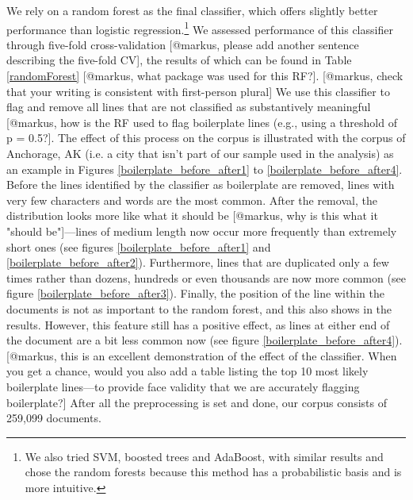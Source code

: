 \documentclass[11pt]{article}
\begin{document}

%

%

We rely on a random forest as the final classifier, which offers slightly better performance than logistic regression.\footnote{We also tried SVM, boosted trees and AdaBoost, with similar results and chose the random forests because this method has a probabilistic basis and is more intuitive.} We assessed performance of this classifier through five-fold cross-validation [@markus, please add another sentence describing the five-fold CV], the results of which can be found in Table \ref{randomForest} [@markus, what package was used for this RF?]. [@markus, check that your writing is consistent with first-person plural] We use this classifier to flag and remove all lines that are not classified as substantively meaningful [@markus, how is the RF used to flag boilerplate lines (e.g., using a threshold of p = 0.5?]. The effect of this process on the corpus is illustrated with the corpus of Anchorage, AK (i.e. a city that isn't part of our sample used in the analysis) as an example in Figures \ref{boilerplate_before_after1} to \ref{boilerplate_before_after4}. Before the lines identified by the classifier as boilerplate are removed, lines with very few characters and words are the most common. After the removal, the distribution looks more like what it should be [@markus, why is this what it "should be"]---lines of medium length now occur more frequently than extremely short ones (see figures \ref{boilerplate_before_after1} and \ref{boilerplate_before_after2}). Furthermore, lines that are duplicated only a few times rather than dozens, hundreds or even thousands are now more common (see figure \ref{boilerplate_before_after3}). Finally, the position of the line within the documents is not as important to the random forest, and this also shows in the results. However, this feature still has a positive effect, as lines at either end of the document are a bit less common now (see figure \ref{boilerplate_before_after4}). [@markus, this is an excellent demonstration of the effect of the classifier. When you get a chance, would you also add a table listing the top 10 most likely boilerplate lines---to provide face validity that we are accurately flagging boilerplate?] After all the preprocessing is set and done, our corpus consists of 259,099 documents.
\end{document}
